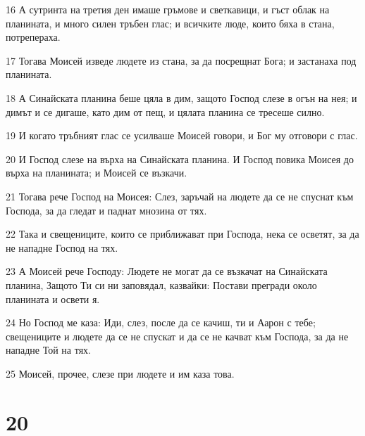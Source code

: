 \par 16 А сутринта на третия ден имаше гръмове и светкавици, и гъст облак на планината, и много силен тръбен глас; и всичките люде, които бяха в стана, потрепераха.
\par 17 Тогава Моисей изведе людете из стана, за да посрещнат Бога; и застанаха под планината.
\par 18 А Синайската планина беше цяла в дим, защото Господ слезе в огън на нея; и димът и се дигаше, като дим от пещ, и цялата планина се тресеше силно.
\par 19 И когато тръбният глас се усилваше Моисей говори, и Бог му отговори с глас.
\par 20 И Господ слезе на върха на Синайската планина. И Господ повика Моисея до върха на планината; и Моисей се възкачи.
\par 21 Тогава рече Господ на Моисея: Слез, заръчай на людете да се не спуснат към Господа, за да гледат и паднат мнозина от тях.
\par 22 Така и свещениците, които се приближават при Господа, нека се осветят, за да не нападне Господ на тях.
\par 23 А Моисей рече Господу: Людете не могат да се възкачат на Синайската планина, Защото Ти си ни заповядал, казвайки: Постави прегради около планината и освети я.
\par 24 Но Господ ме каза: Иди, слез, после да се качиш, ти и Аарон с тебе; свещениците и людете да се не спускат и да се не качват към Господа, за да не нападне Той на тях.
\par 25 Моисей, прочее, слезе при людете и им каза това.

\chapter{20}

